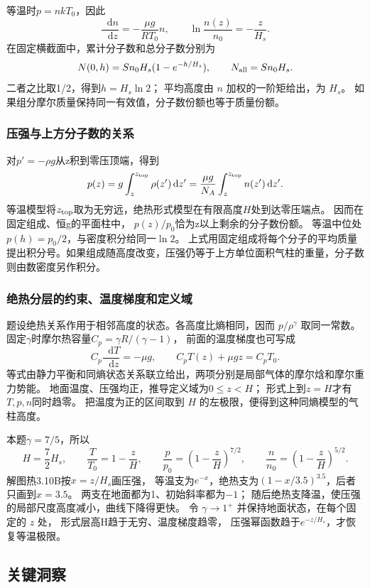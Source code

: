 \documentclass[UTF8,fontset=fandol,a4paper,11pt]{ctexart}
\newcommand{\dd}{\mathop{}\!\mathrm{d}}
\begin{document}
等温时$p=nkT_0$，因此
\[
\frac{\dd n}{\dd z}=-\frac{\mu g}{RT_0}n,\qquad
\ln\frac{n(z)}{n_0}=-\frac z{H_s}.
\]
在固定横截面中，累计分子数和总分子数分别为
\[
N(0,h)=Sn_0H_s(1-e^{-h/H_s}),\qquad
N_{\rm all}=Sn_0H_s.
\]
二者之比取1/2，得到$h=H_s\ln2$；
平均高度由 $n$ 加权的一阶矩给出，为 $H_s$。
如果组分摩尔质量保持同一有效值，分子数份额也等于质量份额。

\subsubsection*{压强与上方分子数的关系}
对$p'=-\rho g$从z积到零压顶端，得到
\[
p(z)=g\int_z^{z_{\rm top}}\rho(z')\dd z'
=\frac{\mu g}{N_A}\int_z^{z_{\rm top}}n(z')\dd z'.
\]
等温模型将$z_{\rm top}$取为无穷远，绝热形式模型在有限高度$H$处到达零压端点。
因而在固定组成、恒g的平面柱中，
$p(z)/p_0$恰为z以上剩余的分子数份额。
等温中位处$p(h)=p_0/2$，与密度积分给同一$\ln2$。
上式用固定组成将每个分子的平均质量提出积分号。如果组成随高度改变，压强仍等于上方单位面积气柱的重量，分子数则由数密度另作积分。

\subsubsection*{绝热分层的约束、温度梯度和定义域}
题设绝热关系作用于相邻高度的状态。各高度比熵相同，因而 $p/\rho^\gamma$ 取同一常数。
固定$\gamma$时摩尔热容量$C_p=\gamma R/(\gamma-1)$，
前面的温度梯度也可写成
\[
C_p\frac{\dd T}{\dd z}=-\mu g,\qquad
C_pT(z)+\mu gz=C_pT_0.
\]
等式由静力平衡和同熵状态关系联立给出，两项分别是局部气体的摩尔焓和摩尔重力势能。
地面温度、压强均正，推导定义域为$0\le z<H$；
形式上到$z=H$才有$T,p,n$同时趋零。
把温度为正的区间取到 $H$ 的左极限，便得到这种同熵模型的气柱高度。

本题$\gamma=7/5$，所以
\[
H=\frac72H_s,\qquad
\frac{T}{T_0}=1-\frac zH,\qquad
\frac p{p_0}=\left(1-\frac zH\right)^{7/2},\qquad
\frac n{n_0}=\left(1-\frac zH\right)^{5/2}.
\]
解图热3.10B按$x=z/H_s$画压强，
等温支为$e^{-x}$，绝热支为$(1-x/3.5)^{3.5}$，后者只画到$x=3.5$。
两支在地面都为1、初始斜率都为$-1$；
随后绝热支降温，使压强的局部尺度高度减小，曲线下降得更快。
令 $\gamma\to1^+$ 并保持地面状态，在每个固定的 $z$ 处，
形式层高H趋于无穷、温度梯度趋零，
压强幂函数趋于$e^{-z/H_s}$，才恢复等温极限。




\subsection*{关键洞察}
\end{document}
